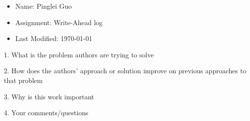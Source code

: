 \documentclass[12pt,a4paper,oneside]{article}
\begin{document}
\begin{itemize}
  \item Name: Pinglei Guo
  \item Assignment: Write-Ahead log
  \item Last Modified: \today
\end{itemize}

1. What is the problem authors are trying to solve

\medskip

2. How does the authors’ approach or solution improve on previous approaches to that problem

\medskip

3. Why is this work important

\medskip

4. Your comments/questions

\medskip
\end{document}
